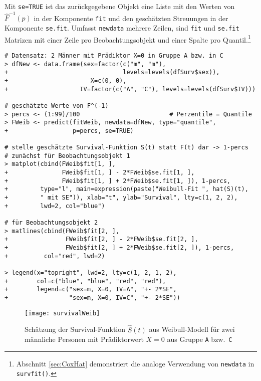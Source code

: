 Mit \lstinline!se=TRUE! ist das zurückgegebene Objekt eine Liste mit den Werten von $\hat{F}^{-1}(p)$ in der Komponente \lstinline!fit! und den geschätzten Streuungen in der Komponente \lstinline!se.fit!. Umfasst \lstinline!newdata! mehrere Zeilen, sind \lstinline!fit! und \lstinline!se.fit! Matrizen mit einer Zeile pro Beobachtungsobjekt und einer Spalte pro Quantil.\footnote{Abschnitt \ref{sec:CoxHat} demonstriert die analoge Verwendung von \lstinline!newdata! in \lstinline!survfit()!.}
\begin{lstlisting}
# Datensatz: 2 Männer mit Prädiktor X=0 in Gruppe A bzw. in C
> dfNew <- data.frame(sex=factor(c("m", "m"),
+                                levels=levels(dfSurv$sex)),
+                       X=c(0, 0),
+                    IV=factor(c("A", "C"), levels=levels(dfSurv$IV)))

# geschätzte Werte von F^(-1)
> percs <- (1:99)/100                         # Perzentile = Quantile
> FWeib <- predict(fitWeib, newdata=dfNew, type="quantile",
+                  p=percs, se=TRUE)

# stelle geschätzte Survival-Funktion S(t) statt F(t) dar -> 1-percs
# zunächst für Beobachtungsobjekt 1
> matplot(cbind(FWeib$fit[1, ],
+               FWeib$fit[1, ] - 2*FWeib$se.fit[1, ],
+               FWeib$fit[1, ] + 2*FWeib$se.fit[1, ]), 1-percs,
+         type="l", main=expression(paste("Weibull-Fit ", hat(S)(t),
+         " mit SE")), xlab="t", ylab="Survival", lty=c(1, 2, 2),
+         lwd=2, col="blue")

# für Beobachtungsobjekt 2
> matlines(cbind(FWeib$fit[2, ],
+                FWeib$fit[2, ] - 2*FWeib$se.fit[2, ],
+                FWeib$fit[2, ] + 2*FWeib$se.fit[2, ]), 1-percs,
+          col="red", lwd=2)

> legend(x="topright", lwd=2, lty=c(1, 2, 1, 2),
+        col=c("blue", "blue", "red", "red"),
+        legend=c("sex=m, X=0, IV=A", "+- 2*SE",
+                 "sex=m, X=0, IV=C", "+- 2*SE"))
\end{lstlisting}

\begin{figure}[ht]
\centering
\texttt{[image: survivalWeib]}
\vspace*{-1em}
\caption{Schätzung der Survival-Funktion $\hat{S}(t)$ aus Weibull-Modell für zwei männliche Personen mit Prädiktorwert $X=0$ aus Gruppe \lstinline!A! bzw.\ \lstinline!C!}
\label{fig:survivalWeib}
\end{figure}

